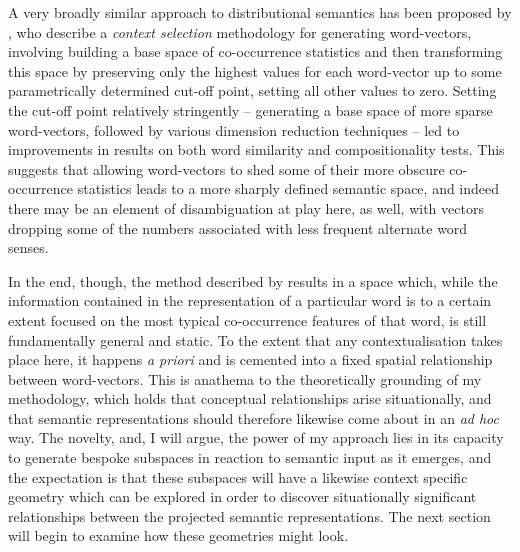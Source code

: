 A very broadly similar approach to distributional semantics has been proposed by \cite{PolajnarEA2014}, who describe a \emph{context selection} methodology for generating word-vectors, involving building a base space of co-occurrence statistics and then transforming this space by preserving only the highest values for each word-vector up to some parametrically determined cut-off point, setting all other values to zero.  Setting the cut-off point relatively stringently -- generating a base space of more sparse word-vectors, followed by various dimension reduction techniques -- led to improvements in results on both word similarity and compositionality tests.  This suggests that allowing word-vectors to shed some of their more obscure co-occurrence statistics leads to a more sharply defined semantic space, and indeed there may be an element of disambiguation at play here, as well, with vectors dropping some of the numbers associated with less frequent alternate word senses.

In the end, though, the method described by \citeauthor{PolajnarEA2014} results in a space which, while the information contained in the representation of a particular word is to a certain extent focused on the most typical co-occurrence features of that word, is still fundamentally general and static.  To the extent that any contextualisation takes place here, it happens \emph{a priori} and is cemented into a fixed spatial relationship between word-vectors.  This is anathema to the theoretically grounding of my methodology, which holds that conceptual relationships arise situationally, and that semantic representations should therefore likewise come about in an \emph{ad hoc} way.  The novelty, and, I will argue, the power of my approach lies in its capacity to generate bespoke subspaces in reaction to semantic input as it emerges, and the expectation is that these subspaces will have a likewise context specific geometry which can be explored in order to discover situationally significant relationships between the projected semantic representations.  The next section will begin to examine how these geometries might look.


